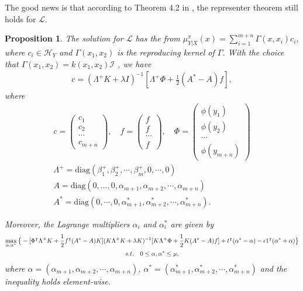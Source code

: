 \documentclass[a4paper]{article}
\newcommand{\up}{\mathrm}
\renewcommand{\cal}{\mathcal}
\newcommand{\T}{\intercal}
\newtheorem{proposition}{Proposition}
\begin{document}
The good news is that according to Theorem 4.2 in \cite{micchelli2005learning}, the representer theorem still holds for $\cal{L}$. 
\begin{proposition}\label{prop:c}
The solution for $\cal{L}$ has the from $\mu_{Y|X}^\pi(x) = \sum_{i=1}^{m+n} \Gamma(x,x_i)c_i$, where $c_i \in \cal{H}_Y$ and $\Gamma(x_1,x_2)$ is the reproducing kernel of $\Gamma$. With the choice that $\Gamma(x_1,x_2) = k(x_1,x_2)\cal{I}$ , we have
\begin{align}
c = (\Lambda^+ K+\lambda I)^{-1}\left[\Lambda^+ \Phi + \frac{1}{2}(A^*-A)f\right],\label{eqn:cKinv}
\end{align}
where
\begin{gather}
c = \begin{pmatrix}
c_1\\
c_2\\
\cdots\\
c_{m+n}
\end{pmatrix},\quad 
f = \begin{pmatrix}
f\\
f\\
\cdots\\
f
\end{pmatrix},\quad
\Phi=\begin{pmatrix}
\phi(y_1)\\
\phi(y_2)\\
\cdots\\
\phi(y_{m+n})
\end{pmatrix}\\
\Lambda^+ = \up{diag}(\beta_1^+,\beta_2^+,\cdots,\beta_m^+,0,\cdots,0)\\
A = \up{diag}(0,\dots,0,\alpha_{m+1},\alpha_{m+2},\cdots,\alpha_{m+n})\\
A^* = \up{diag}(0,\cdots,0,\alpha_{m+1}^*,\alpha_{m+2}^*,\cdots,\alpha_{m+n}^*).
\end{gather}

Moreover, the Lagrange multipliers $\alpha_i$ and $\alpha_i^*$ are given by
\begin{gather}
\max_{\alpha,\alpha^*} \big\{ -[\Phi^\T \Lambda^+ K + \frac{1}{2} f^\T (A^* - A)K](K\Lambda^+ K +\lambda K)^{-1}[K\Lambda^+ \Phi + \frac{1}{2} K (A^* - A)f]+ t^\T (\alpha^* - \alpha) - \epsilon 1^\T (\alpha^* + \alpha)\big\}\label{eqn:lagmulti}\\
 s.t.\quad 0 \leq \alpha,\alpha^* \leq \mu,\notag
\end{gather}
where $\alpha = (\alpha_{m+1},\alpha_{m+2},\cdots,\alpha_{m+n})$, $\alpha^* = (\alpha_{m+1}^*,\alpha_{m+2}^*,\cdots,\alpha_{m+n}^*)$ and the inequality holds element-wise.
\end{proposition}
\end{document}
